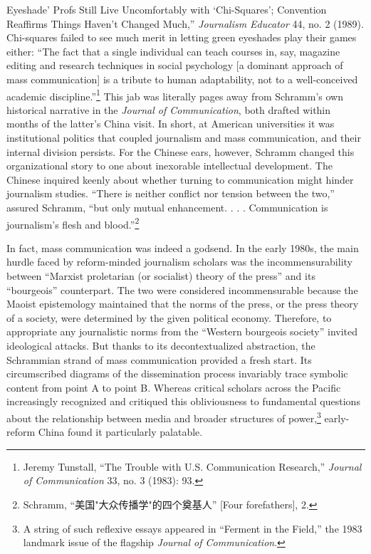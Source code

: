 \documentclass{tufte-handout}
\begin{document}
\begin{CJK*}{UTF8}{gbsn}
{  Eyeshade' Profs Still Live Uncomfortably with `Chi-Squares';
  Convention Reaffirms Things Haven't Changed Much,'' \emph{Journalism
  Educator} 44, no. 2 (1989).} Chi-squares failed to see much merit in
letting green eyeshades play their games either: ``The fact that a
single individual can teach courses in, say, magazine editing and
research techniques in social psychology {[}a dominant approach of mass
communication{]} is a tribute to human adaptability, not to a
well-conceived academic discipline.''\footnote{Jeremy Tunstall, ``The
  Trouble with U.S. Communication Research,'' \emph{Journal of
  Communication} 33, no. 3 (1983): 93.} This jab was literally pages
away from Schramm's own historical narrative in the \emph{Journal of
Communication}, both drafted within months of the latter's China visit.
In short, at American universities it was institutional politics that
coupled journalism and mass communication, and their internal division
persists. For the Chinese ears, however, Schramm changed this
organizational story to one about inexorable intellectual development.
The Chinese inquired keenly about whether turning to communication might
hinder journalism studies. ``There is neither conflict nor tension
between the two,'' assured Schramm, ``but only mutual enhancement. . . .
Communication is journalism's flesh and blood.''\footnote{Schramm,
  ``美国"大众传播学"的四个奠基人'' {[}Four forefathers{]}, 2.}
  


In fact, mass communication was indeed a godsend. In the early 1980s,
the main hurdle faced by reform-minded journalism scholars was the
incommensurability between ``Marxist proletarian (or socialist) theory
of the press'' and its ``bourgeois'' counterpart. The two were
considered incommensurable because the Maoist epistemology maintained
that the norms of the press, or the press theory of a society, were
determined by the given political economy. Therefore, to appropriate any
journalistic norms from the ``Western bourgeois society'' invited
ideological attacks. But thanks to its decontextualized abstraction, the
Schrammian strand of mass communication provided a fresh start. Its
circumscribed diagrams of the dissemination process invariably trace
symbolic content from point A to point B. Whereas critical scholars
across the Pacific increasingly recognized and critiqued this
obliviousness to fundamental questions about the relationship between
media and broader structures of power,\footnote{A string of such
  reflexive essays appeared in ``Ferment in the Field,'' the 1983
  landmark issue of the flagship \emph{Journal of Communication}.}
early-reform China found it particularly palatable.


\end{CJK*}
\end{document}
